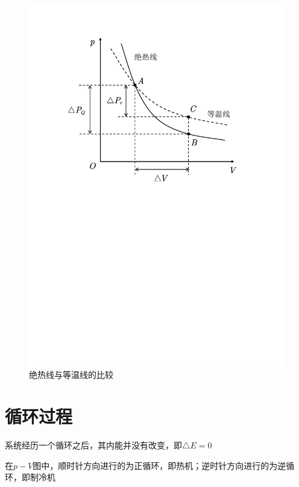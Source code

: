 \documentclass[12pt, a4paper, twoside]{ctexbook}
\begin{document}
\begin{figure}[H]

    \centering
\includegraphics[scale=0.6]{Figures/pic1.pdf}  
\caption{绝热线与等温线的比较}
\label{fig1}
\end{figure}



\section{循环过程}
系统经历一个循环之后，其内能并没有改变，即$\bigtriangleup E=0$

在$p-V$图中，顺时针方向进行的为正循环，即热机；逆时针方向进行的为逆循环，即制冷机
\end{document}
